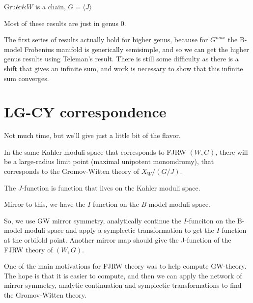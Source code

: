 \documentclass{amsart}
\theoremstyle{definition}
\begin{document}
Gru\'er\'e:$W$ is a chain, $G=\langle J\rangle$


Most of these results are just in genus 0.

The first series of results actually hold for higher genus, because for $G^{max}$ the B-model Frobenius manifold is generically semisimple, and so we can get the higher genus results using Teleman's result.  There is still some difficulty as there is a shift that gives an infinite sum, and work is necessary to show that this infinite sum converges.

\section{LG-CY correspondence}
Not much time, but we'll give just a little bit of the flavor.

In the same Kahler moduli space that corresponds to FJRW $(W,G)$, there will be a large-radius limit point (maximal unipotent monomdromy), that corresponds to the Gromov-Witten theory of $X_W/(G/J)$.  

The $J$-function is function that lives on the Kahler moduli space.

Mirror to this, we have the $I$ function on the $B$-model moduli space.

So, we use GW mirror symmetry, analytically continue the $I$-funciton on the B-model moduli space and apply a symplectic transformation to get the $I$-function at the orbifold point.  Another mirror map should give the J-function of the FJRW theory of $(W,G)$.

One of the main motivations for FJRW theory was to help compute GW-theory.  The hope is that it is easier to compute, and then we can apply the network of mirror symmetry, analytic continuation and symplectic transformations to find the Gromov-Witten theory.
\end{document}
